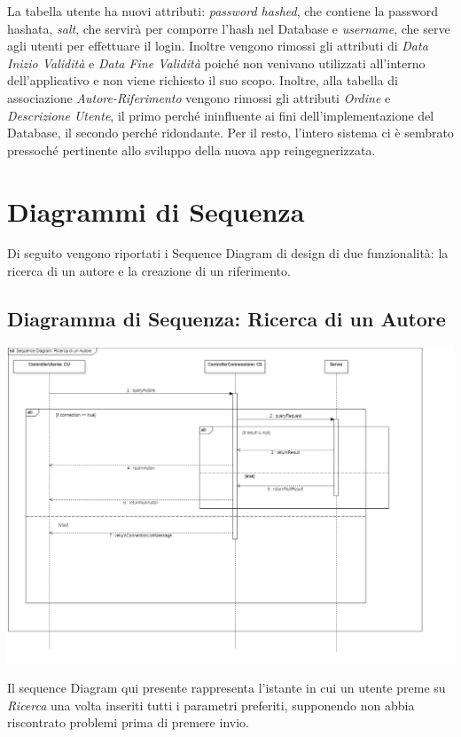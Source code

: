 La tabella utente ha nuovi attributi: \textit{password hashed}, che contiene la password hashata, \textit{salt}, che servirà per comporre l'hash nel Database e \textit{username}, che serve agli utenti per effettuare il login. Inoltre vengono rimossi gli attributi di \textit{Data Inizio Validità} e \textit{Data Fine Validità} poiché non venivano utilizzati all'interno dell'applicativo e non viene richiesto il suo scopo. Inoltre, alla tabella di associazione \textit{Autore-Riferimento} vengono rimossi gli attributi \textit{Ordine} e \textit{Descrizione Utente}, il primo perché ininfluente ai fini dell'implementazione del Database, il secondo perché ridondante. Per il resto, l'intero sistema ci è sembrato pressoché pertinente allo sviluppo della nuova app reingegnerizzata.

\raggedright{\section{Diagrammi di Sequenza}}
Di seguito vengono riportati i Sequence Diagram di design di due funzionalità: la ricerca di un autore e la creazione di un riferimento. 

\raggedright{\subsection{Diagramma di Sequenza: Ricerca di un Autore}}

        \begin{center}
            \includegraphics[width=.95\textwidth]{Immagini/Alexandria/sequenceDiagramDesign1.PNG} 
        \end{center}

Il sequence Diagram qui presente rappresenta l'istante in cui un utente preme su \textit{Ricerca} una volta inseriti tutti i parametri preferiti, supponendo non abbia riscontrato problemi prima di premere invio. 

